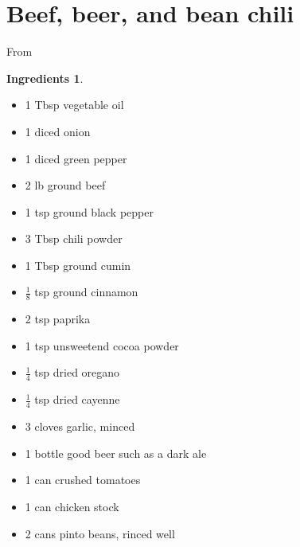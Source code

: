 \documentclass[a4paper,12pt]{scrreprt}
\theoremstyle{definition}
\newtheorem*{ingredients}{Ingredients}
\theoremstyle{plain}
\theoremstyle{remark}
\begin{document}
\section{Beef, beer, and bean chili}\label{sec:beef_beer_and_bean_chili}
From \cite{foodwishesbeefbeanbeerchili}
\begin{ingredients}
  $\,$

  \begin{multicols}{2}
    \begin{itemize}
      \item 1 Tbsp vegetable oil

      \item 1 diced onion

      \item 1 diced green pepper

      \item 2 lb ground beef

      \item 1 tsp ground black pepper

      \item 3 Tbsp chili powder

      \item 1 Tbsp ground cumin

      \item $\frac{1}{8}$ tsp ground cinnamon

      \item 2 tsp paprika

      \item 1 tsp unsweetend cocoa powder

      \item $\frac{1}{4}$ tsp dried oregano

      \item $\frac{1}{4}$ tsp dried cayenne

      \item 3 cloves garlic, minced

      \item 1 bottle good beer such as a dark ale

      \item 1 can crushed tomatoes

      \item 1 can chicken stock

      \item 2 cans pinto beans, rinced well
    \end{itemize}
  \end{multicols}
\end{ingredients}
\end{document}
